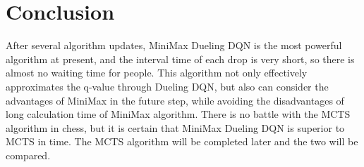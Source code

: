 \documentclass[10pt,twocolumn,letterpaper]{article}
\begin{document}
\section{Conclusion}
After several algorithm updates, MiniMax Dueling DQN is the most powerful algorithm at present, and the interval time of each drop is very short, so there is almost no waiting time for people. This algorithm not only effectively approximates the q-value through Dueling DQN, but also can consider the advantages of MiniMax in the future step, while avoiding the disadvantages of long calculation time of MiniMax algorithm. There is no battle with the MCTS algorithm in chess, but it is certain that MiniMax Dueling DQN is superior to MCTS in time. The MCTS algorithm will be completed later and the two will be compared.




{\small


}
\end{document}
